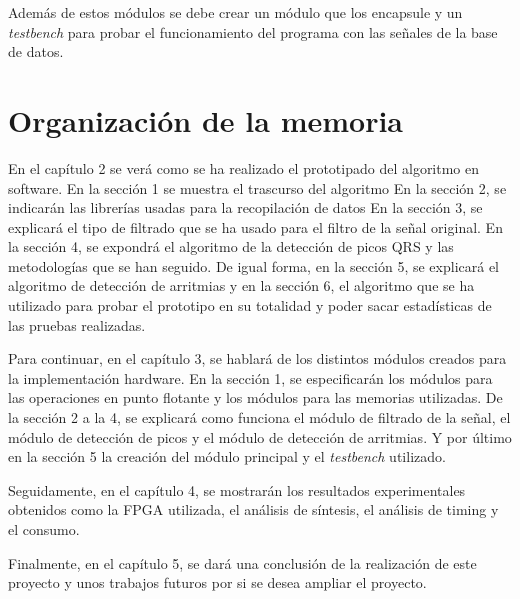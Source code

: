 	Además de estos módulos se debe crear un módulo que los encapsule y un \textit{testbench} para probar el funcionamiento del programa con las señales de la base de datos\cite{desai2021low}.

\section{Organización de la memoria}
En el capítulo 2 se verá como se ha realizado el prototipado del algoritmo en software. En la sección 1 se muestra el trascurso del algoritmo En la sección 2, se indicarán las librerías usadas para la recopilación de datos En la sección 3, se explicará
el tipo de filtrado que se ha usado para el filtro de la señal original. En la sección 4, se expondrá el algoritmo de la detección de picos QRS y las metodologías que se han seguido. De igual forma, en la sección 5, se explicará el algoritmo de detección de arritmias y en la sección 6, el algoritmo que se ha utilizado para probar el prototipo en su totalidad y poder sacar estadísticas de las pruebas realizadas.

Para continuar, en el capítulo 3, se hablará de los distintos módulos creados para la implementación hardware. En la sección 1, se especificarán los módulos para las operaciones en punto
flotante y los módulos para las memorias utilizadas. De la sección 2 a la 4, se explicará como funciona el módulo de filtrado de la señal, el módulo de detección de picos y el módulo de detección de arritmias. Y por último en la sección 5 la creación del módulo principal y el \textit{testbench} utilizado.

Seguidamente, en el capítulo 4, se mostrarán los resultados experimentales obtenidos como la FPGA utilizada, el análisis de síntesis, el análisis de timing y el consumo.

Finalmente, en el capítulo 5, se dará una conclusión de la realización de este proyecto y unos trabajos futuros por si se desea ampliar el proyecto.
